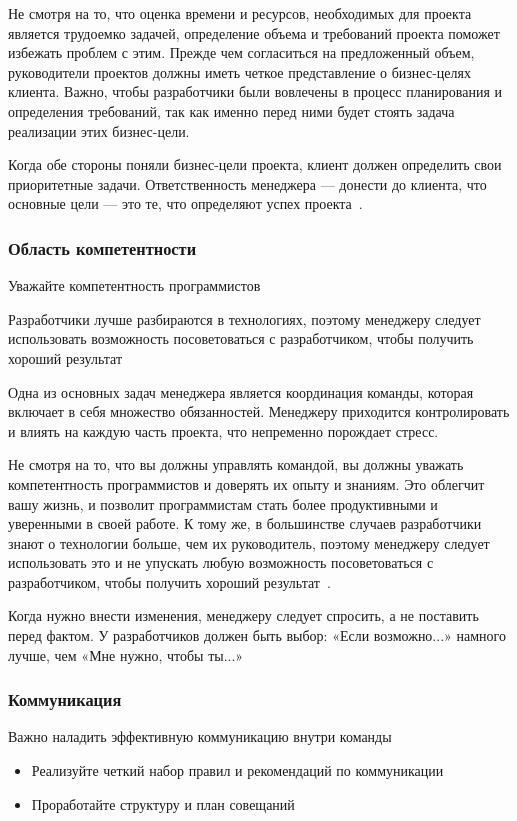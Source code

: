 \documentclass[]{../industrial-development}
\begin{document}
\lecturenotes

Не смотря на то, что оценка времени и ресурсов, необходимых для проекта является трудоемко задачей, определение объема и требований проекта поможет избежать проблем с этим. Прежде чем согласиться на предложенный объем, руководители проектов должны иметь четкое представление о бизнес-целях клиента. Важно, чтобы разработчики были вовлечены в процесс планирования и определения требований, так как именно перед ними будет стоять задача реализации этих бизнес-цели.

Когда обе стороны поняли бизнес-цели проекта, клиент должен определить свои приоритетные задачи. Ответственность менеджера — донести до клиента, что основные цели — это те, что определяют успех проекта~\cite{Codementor}. 

\begin{frame} \frametitle{Область компетентности} 
\begin{block}{}
Уважайте компетентность программистов
\end{block}
Разработчики лучше разбираются в технологиях, поэтому менеджеру следует использовать возможность посоветоваться с разработчиком, чтобы получить хороший результат
\end{frame}

\lecturenotes

Одна из основных задач менеджера является координация команды, которая включает в себя множество обязанностей. Менеджеру приходится контролировать и влиять на каждую часть проекта, что непременно порождает стресс. 

Не смотря на то, что вы должны управлять командой, вы должны уважать компетентность программистов и доверять их опыту и знаниям. Это облегчит вашу жизнь, и позволит программистам стать более продуктивными и уверенными в своей работе. К тому же, в большинстве случаев разработчики знают о технологии больше, чем их руководитель, поэтому менеджеру следует использовать это и не упускать любую возможность посоветоваться с разработчиком, чтобы получить хороший результат~\cite{Codementor}.

Когда нужно внести изменения, менеджеру следует спросить, а не поставить перед фактом. У разработчиков должен быть выбор: «Если возможно...» намного лучше, чем «Мне нужно, чтобы ты...»

\begin{frame} \frametitle{Коммуникация} 
\begin{block}{}
Важно наладить эффективную коммуникацию внутри команды
\end{block}
\begin{itemize}
\item Реализуйте четкий набор правил и рекомендаций по коммуникации
\item Проработайте структуру и план совещаний
\end{itemize}
\end{frame}
\end{document}
